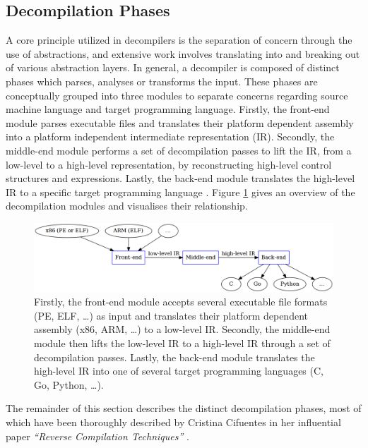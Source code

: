 
\subsection{Decompilation Phases}
\label{sec:lit_review_decompilation_phases}

A core principle utilized in decompilers is the separation of concern through the use of abstractions, and extensive work involves translating into and breaking out of various abstraction layers. In general, a decompiler is composed of distinct phases which parses, analyses or transforms the input. These phases are conceptually grouped into three modules to separate concerns regarding source machine language and target programming language. Firstly, the front-end module parses executable files and translates their platform dependent assembly into a platform independent intermediate representation (IR). Secondly, the middle-end module performs a set of decompilation passes to lift the IR, from a low-level to a high-level representation, by reconstructing high-level control structures and expressions. Lastly, the back-end module translates the high-level IR to a specific target programming language \cite{reverse_comp}. Figure \ref{fig:modules_overview} gives an overview of the decompilation modules and visualises their relationship.

\begin{figure}[htbp]
	\begin{center}
		\includegraphics[width=\textwidth]{inc/2_lit_review/modules_overview.png}
		\caption{Firstly, the front-end module accepts several executable file formats (PE, ELF, …) as input and translates their platform dependent assembly (x86, ARM, …) to a low-level IR. Secondly, the middle-end module then lifts the low-level IR to a high-level IR through a set of decompilation passes. Lastly, the back-end module translates the high-level IR into one of several target programming languages (C, Go, Python, …).}
		\label{fig:modules_overview}
	\end{center}
\end{figure}

The remainder of this section describes the distinct decompilation phases, most of which have been thoroughly described by Cristina Cifuentes in her influential paper \textit{``Reverse Compilation Techniques''} \cite{reverse_comp}.





